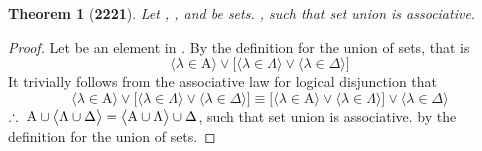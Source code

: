 \documentclass[preview]{standalone}
\newtheorem{theorem}{Theorem}
\begin{document}
\begin{theorem}[\textbf{2221}]
    Let , \bm{$\Lambda$}, and \bm{$\Delta$} be sets. 
    , 
    such that set union is associative.
\end{theorem}
\begin{proof}
    Let \bm{$\lambda$} be an element in 
    . 
    By the definition for the union of sets, that is
    \begin{equation*}
        \Big \langle \lambda \in \mathrm{A} \Big \rangle
            \lor
        \bigg[
            \Big \langle \lambda \in \Lambda \Big \rangle
                \lor
            \Big \langle \lambda \in \Delta \Big \rangle
        \bigg]
    \end{equation*}
    It trivially follows from the associative law for logical disjunction that
    \begin{equation*}
        \Big \langle \lambda \in \mathrm{A} \Big \rangle
            \lor
        \bigg[
            \Big \langle \lambda \in \Lambda \Big \rangle
                \lor
            \Big \langle \lambda \in \Delta \Big \rangle
        \bigg]
            \equiv
        \bigg[
            \Big \langle \lambda \in \mathrm{A} \Big \rangle
                \lor
            \Big \langle \lambda \in \Lambda \Big \rangle
        \bigg]
            \lor
        \Big \langle \lambda \in \Delta \Big \rangle
    \end{equation*}
    $\therefore \text{\space} \relax{
    \mathrm{A} 
        \cup 
    \big \langle \Lambda \cup \Delta \big \rangle 
        = 
    \big \langle \mathrm{A} \cup \Lambda \big \rangle 
        \cup 
    \Delta
    }$, 
    such that set union is associative.
    by the definition for the union of sets.
\end{proof}
\end{document}
